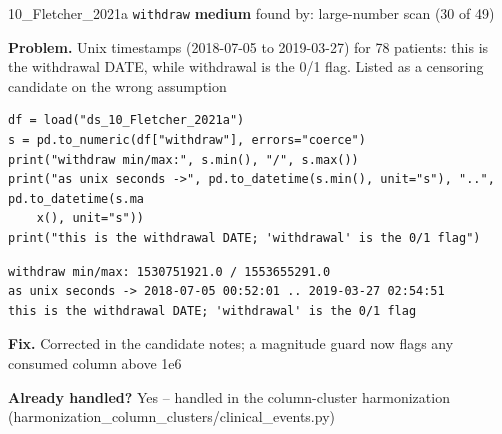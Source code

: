 \documentclass[9pt, t, handout]{beamer}
\newcommand{\ans}[1]{\textcolor{structure.fg}{#1}}
\begin{document}
\begin{frame}[fragile]{10\_Fletcher\_2021a \quad \texttt{withdraw}}
  {\scriptsize\textcolor{blue!55!black}{\textbf{medium}} \quad
   found by: large-number scan \quad (30 of 49)}
  \vspace{3pt}

  {\footnotesize \textbf{Problem.} Unix timestamps (2018-07-05 to 2019-03-27) for 78 patients: this is the withdrawal DATE, while withdrawal is the 0/1 flag. Listed as a censoring candidate on the wrong assumption}
  \vspace{4pt}

  \begin{Verbatim}[fontsize=\tiny, frame=single, framesep=2pt, label=\tiny reproduce]
df = load("ds_10_Fletcher_2021a")
s = pd.to_numeric(df["withdraw"], errors="coerce")
print("withdraw min/max:", s.min(), "/", s.max())
print("as unix seconds ->", pd.to_datetime(s.min(), unit="s"), "..", pd.to_datetime(s.ma
    x(), unit="s"))
print("this is the withdrawal DATE; 'withdrawal' is the 0/1 flag")
  \end{Verbatim}
  \begin{Verbatim}[fontsize=\tiny, frame=single, framesep=2pt, label=\tiny output]
withdraw min/max: 1530751921.0 / 1553655291.0
as unix seconds -> 2018-07-05 00:52:01 .. 2019-03-27 02:54:51
this is the withdrawal DATE; 'withdrawal' is the 0/1 flag
  \end{Verbatim}
  \vspace{2pt}

  {\footnotesize \textbf{Fix.} Corrected in the candidate notes; a magnitude guard now flags any consumed column above 1e6}
  \vspace{2pt}

  {\footnotesize \textbf{Already handled?} \ans{Yes} -- handled in the column-cluster harmonization
   (harmonization\_column\_clusters/clinical\_events.py)}
\end{frame}
\end{document}

